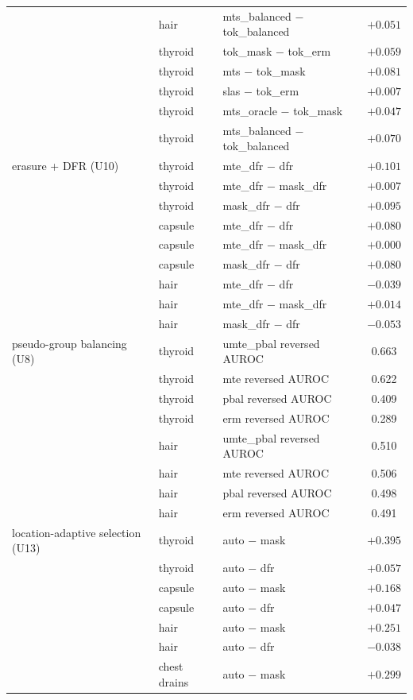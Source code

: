 {\begin{longtable}{p{4.0cm}p{3.6cm}p{5.2cm}c}
 & hair & mts\_balanced $-$ tok\_balanced & $+0.051$ \\
 & thyroid & tok\_mask $-$ tok\_erm & $+0.059$ \\
 & thyroid & mts $-$ tok\_mask & $+0.081$ \\
 & thyroid & slas $-$ tok\_erm & $+0.007$ \\
 & thyroid & mts\_oracle $-$ tok\_mask & $+0.047$ \\
 & thyroid & mts\_balanced $-$ tok\_balanced & $+0.070$ \\
erasure + DFR (U10) & thyroid & mte\_dfr $-$ dfr & $+0.101$ \\
 & thyroid & mte\_dfr $-$ mask\_dfr & $+0.007$ \\
 & thyroid & mask\_dfr $-$ dfr & $+0.095$ \\
 & capsule & mte\_dfr $-$ dfr & $+0.080$ \\
 & capsule & mte\_dfr $-$ mask\_dfr & $+0.000$ \\
 & capsule & mask\_dfr $-$ dfr & $+0.080$ \\
 & hair & mte\_dfr $-$ dfr & $-0.039$ \\
 & hair & mte\_dfr $-$ mask\_dfr & $+0.014$ \\
 & hair & mask\_dfr $-$ dfr & $-0.053$ \\
pseudo-group balancing (U8) & thyroid & umte\_pbal reversed AUROC & 0.663 \\
 & thyroid & mte reversed AUROC & 0.622 \\
 & thyroid & pbal reversed AUROC & 0.409 \\
 & thyroid & erm reversed AUROC & 0.289 \\
 & hair & umte\_pbal reversed AUROC & 0.510 \\
 & hair & mte reversed AUROC & 0.506 \\
 & hair & pbal reversed AUROC & 0.498 \\
 & hair & erm reversed AUROC & 0.491 \\
location-adaptive selection (U13) & thyroid & auto $-$ mask & $+0.395$ \\
 & thyroid & auto $-$ dfr & $+0.057$ \\
 & capsule & auto $-$ mask & $+0.168$ \\
 & capsule & auto $-$ dfr & $+0.047$ \\
 & hair & auto $-$ mask & $+0.251$ \\
 & hair & auto $-$ dfr & $-0.038$ \\
 & chest drains & auto $-$ mask & $+0.299$ \\

\end{longtable}}
